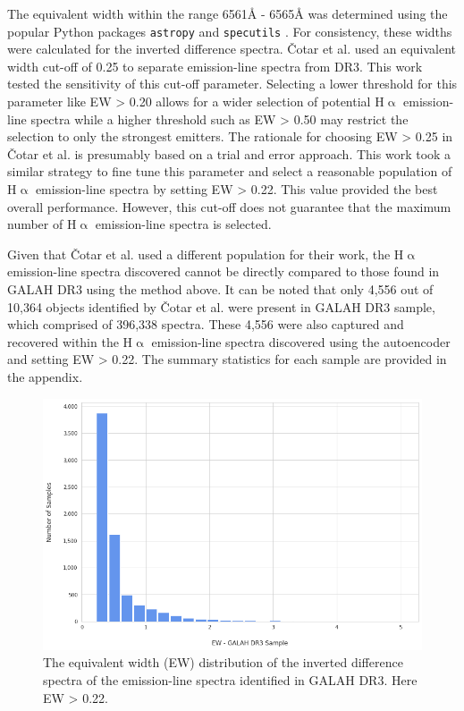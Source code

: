 The equivalent width within the range 6561\r{A} - 6565\r{A} was determined using the popular Python packages \texttt{astropy} \citep{astropy:2018, astropy:2013} and \texttt{specutils} \citep{specutils}. For consistency, these widths were calculated for the inverted difference spectra. Čotar et al. used an equivalent width cut-off of 0.25 to separate emission-line spectra from DR3. This work tested the sensitivity of this cut-off parameter. Selecting a lower threshold for this parameter like EW > 0.20 allows for a wider selection of potential H$\upalpha$ emission-line spectra while a higher threshold such as EW > 0.50 may restrict the selection to only the strongest emitters. The rationale for choosing EW > 0.25 in Čotar et al. is presumably based on a trial and error approach. This work took a similar strategy to fine tune this parameter and select a reasonable population of H$\upalpha$ emission-line spectra by setting EW > 0.22. This value provided the best overall performance. However, this cut-off does not guarantee that the maximum number of H$\upalpha$ emission-line spectra is selected. 

Given that Čotar et al. used a different population for their work, the H$\upalpha$ emission-line spectra discovered cannot be directly compared to those found in GALAH DR3 using the method above. It can be noted that only 4,556 out of 10,364 objects identified by Čotar et al. were present in GALAH DR3 sample, which comprised of 396,338 spectra. These 4,556 were also captured and recovered within the H$\upalpha$ emission-line spectra discovered using the autoencoder and setting EW > 0.22. The summary statistics for each sample are provided in the appendix.

\begin{figure}[!htb]
\centering
\includegraphics[scale=0.50]{figures/EW hist.png}
\caption{The equivalent width (EW) distribution of the inverted difference spectra of the emission-line spectra identified in GALAH DR3. Here EW > 0.22.}
\end{figure}



